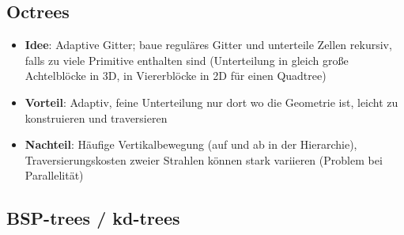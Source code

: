 \documentclass[10pt,a4paper]{article}
\begin{document}
	\subsection{Octrees}
	\label{ds:sub:octrees}
	
	\begin{itemize}
		\item \textbf{Idee}: Adaptive Gitter; baue reguläres Gitter und unterteile Zellen rekursiv, falls zu viele Primitive enthalten sind (Unterteilung in gleich große Achtelblöcke in 3D, in Viererblöcke in 2D für einen Quadtree)
		\item \textbf{Vorteil}: Adaptiv, feine Unterteilung nur dort wo die Geometrie ist, leicht zu konstruieren und traversieren
		\item \textbf{Nachteil}: Häufige Vertikalbewegung (auf und ab in der Hierarchie), Traversierungskosten zweier Strahlen können stark variieren (Problem bei Parallelität)
	\end{itemize}

	\subsection{BSP-trees / kd-trees}
	\label{ds:sub:bsp_trees_kd_trees}
	
\end{document}
